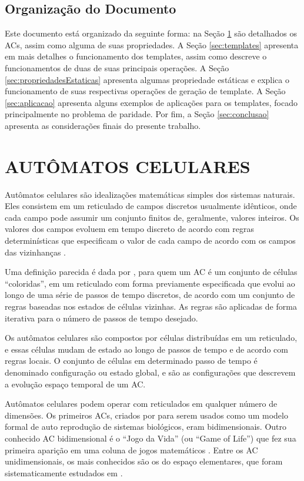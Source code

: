 \documentclass[12pt,a4paper]{article}
\let\stdsection\section
\renewcommand\section{\newpage\stdsection}
\begin{document}
\subsection{Organização do Documento}
Este documento está organizado da seguinte forma: na Seção \ref{sec:acs} são detalhados os ACs, assim como alguma de suas propriedades. A Seção \ref{sec:templates} apresenta em mais detalhes o funcionamento dos templates, assim como descreve o funcionamentos de duas de suas principais operações. A Seção \ref{sec:propriedadesEstaticas} apresenta algumas propriedade estáticas e explica o funcionamento de suas respectivas operações de geração de template. A Seção \ref{sec:aplicacao} apresenta alguns exemplos de aplicações para os templates, focado principalmente no problema de paridade. Por fim, a Seção \ref{sec:conclusao} apresenta as considerações finais do presente trabalho.








\section{AUTÔMATOS CELULARES}\label{sec:acs}
Autômatos celulares são idealizações matemáticas simples dos sistemas naturais. Eles consistem em um reticulado de campos discretos usualmente idênticos, onde cada campo pode assumir um conjunto finitos de, geralmente, valores inteiros. Os valores dos campos evoluem em tempo discreto de acordo com regras determinísticas que especificam o valor de cada campo de acordo com os campos das vizinhanças \cite{wolfram1994cellular}.

Uma definição parecida é dada por , para quem um AC é um conjunto de células ``coloridas'', em um reticulado com forma previamente especificada que evolui ao longo de uma série de passos de tempo discretos, de acordo com um conjunto de regras baseadas nos estados de células vizinhas. As regras são aplicadas de forma iterativa para o número de passos de tempo desejado.

Os autômatos celulares são compostos por células distribuídas em um reticulado, e essas células mudam de estado ao longo de passos de tempo e de acordo com regras locais. O conjunto de células em determinado passo de tempo é denominado configuração ou estado global, e são as configurações que descrevem a evolução espaço temporal de um AC. 

Autômatos celulares podem operar com reticulados em qualquer número de dimensões. Os primeiros ACs, criados por  para serem usados como um modelo formal de auto reprodução de sistemas biológicos, eram bidimensionais. Outro conhecido AC bidimensional é o ``Jogo da Vida'' (ou ``Game of Life'') que fez sua primeira aparição em uma coluna de jogos matemáticos \cite{GardnerM1970}. Entre os AC unidimensionais, os mais conhecidos são os do espaço elementares, que foram sistematicamente estudados em .
\end{document}

